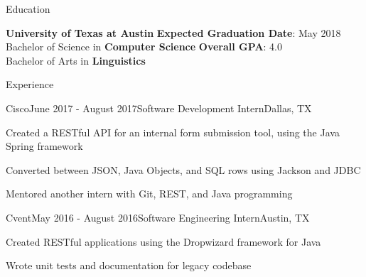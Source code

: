 \documentclass{resume} %
\begin{document}

\begin{rSection}{Education}

    {\bf University of Texas at Austin} \hfill {\textbf{Expected Graduation Date}: May 2018} \\ 
    Bachelor of Science in \textbf{Computer Science} \hfill \textbf{Overall GPA}: 4.0 \\
Bachelor of Arts in \textbf{Linguistics}
\end{rSection}


\begin{rSection}{Experience}

\begin{rSubsection}{Cisco}{June 2017 - August 2017}{Software Development Intern}{Dallas, TX}
\item Created a RESTful API for an internal form submission tool, using the Java Spring framework
\item Converted between JSON, Java Objects, and SQL rows using Jackson and JDBC
\item Mentored another intern with Git, REST, and Java programming
\end{rSubsection}

\begin{rSubsection}{Cvent}{May 2016 - August 2016}{Software Engineering Intern}{Austin, TX}
\item Created RESTful applications using the Dropwizard framework for Java
\item Wrote unit tests and documentation for legacy codebase
\end{rSubsection}

\end{rSection}
\end{document}
